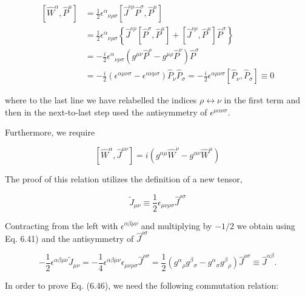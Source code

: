 \documentclass[10pt, letterpaper]{article}
\begin{document}
$$
\begin{aligned}
{\left[\hat{W}^{\alpha}, \hat{P}^{\mu}\right] } & =\frac{1}{2} \epsilon^{\alpha}{ }_{\nu \rho \sigma}\left[\hat{J}^{\nu \rho} \hat{P}^{\sigma}, \hat{P}^{\mu}\right] \\
& =\frac{1}{2} \epsilon^{\alpha}{ }_{\nu \rho \sigma}\left\{\hat{J}^{\nu \rho}\left[\hat{P}^{\sigma}, \hat{P}^{\mu}\right]+\left[\hat{J}^{\nu \rho}, \hat{P}^{\mu}\right] \hat{P}^{\sigma}\right\} \\
& =-\frac{i}{2} \epsilon^{\alpha}{ }_{\nu \rho \sigma}\left(g^{\mu \nu} \hat{P}^{\rho}-g^{\mu \rho} \hat{P}^{\nu}\right) \hat{P}^{\sigma} \\
& =-\frac{i}{2}\left(\epsilon^{\alpha \mu \nu \sigma}-\epsilon^{\alpha \nu \mu \sigma}\right) \hat{P}_{\nu} \hat{P}_{\sigma}=-\frac{i}{2} \epsilon^{\alpha \mu \nu \sigma}\left[\hat{P}_{\nu}, \hat{P}_{\sigma}\right] \equiv 0
\end{aligned}
$$

where to the last line we have relabelled the indices $\rho \leftrightarrow \nu$ in the first term and then in the next-to-last step used the antisymmetry of $\epsilon^{\mu \alpha \nu \sigma}$.

Furthermore, we require

$$
\left[\hat{W}^{\alpha}, \hat{J}^{\mu \nu}\right]=i\left(g^{\alpha \mu} \hat{W}^{\nu}-g^{\alpha \nu} \hat{W}^{\mu}\right)
$$

The proof of this relation utilizes the definition of a new tensor,

$$
\tilde{J}_{\mu \nu} \equiv \frac{1}{2} \epsilon_{\mu \nu \rho \sigma} \hat{J}^{\rho \sigma}
$$

Contracting from the left with $\epsilon^{\alpha \beta \mu \nu}$ and multiplying by $-1 / 2$ we obtain using Eq. 6.41) and the antisymmetry of $\hat{J}^{\rho \sigma}$

$$
-\frac{1}{2} \epsilon^{\alpha \beta \mu \nu} \tilde{J}_{\mu \nu}=-\frac{1}{4} \epsilon^{\alpha \beta \mu \nu} \epsilon_{\mu \nu \rho \sigma} \hat{J}^{\rho \sigma}=\frac{1}{2}\left(g^{\alpha}{ }_{\rho} g^{\beta}{ }_{\sigma}-g^{\alpha}{ }_{\sigma} g^{\beta}{ }_{\rho}\right) \hat{J}^{\rho \sigma} \equiv \hat{J}^{\alpha \beta} .
$$

In order to prove Eq. (6.46), we need the following commutation relation:
\end{document}
